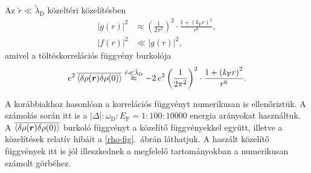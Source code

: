 \documentclass[a4paper,12pt,titlepage]{article}
\newcommand{\RR}{{\vb*{r}}}
\newcommand{\kF}{{k_\text{F}}}
\newcommand{\EF}{{E_\text{F}}}
\begin{document}
Az $\tilde{r} \ll \tilde{\lambda}_\text{D}$ közeltéri közelítésben
\begin{equation} \label{f2-g2-near}
\begin{split}
	\left| g(r) \right|^2 & \approx \left( \frac{1}{2 \pi^2} \right)^2 \cdot \frac{1 + \left( \kF r \right)^2}{r^6}, \\
	\left| f(r) \right|^2 & \ll \left| g(r) \right|^2,
\end{split}
\end{equation}
amivel a töltéskorrelációs függvény burkolója
\begin{equation}
	e^2 \, \overline{\expval{\delta\rho(\RR) \delta\rho(0)}} \stackrel{\tilde{r} \ll \tilde{\lambda}_\text{D}}{\approx} -2 \, e^2 \left( \frac{1}{2 \pi^2} \right)^2 \cdot \frac{1 + \left( \kF r \right)^2}{r^6}.
\end{equation}

A korábbiakhoz hasonlóan a korrelációs függvényt numerikusan is ellenőriztük.  A számolás során itt is a $\left| \Delta \right| : \omega_\text{D} : \EF = 1 : 100 : 10000$ energia arányokat használtuk.  A $\overline{\expval{\delta\rho(\RR) \delta\rho(0)}}$ burkoló függvényt a közelítő függvényekkel együtt, illetve a közelítések relatív hibáit a \ref{rho-fig}.\ ábrán láthatjuk.  A haszált közelítő függvények itt is jól illeszkednek a megfelelő tartományokban a numerikusan számolt görbéhez.
\end{document}
